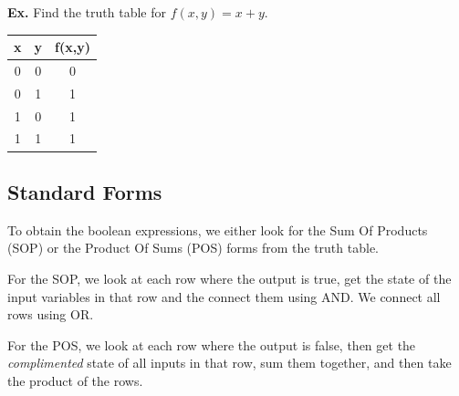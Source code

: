 \documentclass[12pt,letterpaper]{article} \usepackage{amsmath} \usepackage{graphicx}  \usepackage{longtable}  \usepackage{amssymb}
\begin{document}
    \begin{mdframed}
        \textbf{Ex. } Find the truth table for $f(x,y) = x+y$.

        \begin{center}
            \begin{tabular}{ c | c | c }
                x & y & f(x,y) \\
                \hline
                0&0&0\\
                0&1&1\\
                1&0&1\\
                1&1&1
            \end{tabular}        
        \end{center}
        
    \end{mdframed}

        \subsection{Standard Forms}
        To obtain the boolean expressions, we either look for the Sum Of Products (SOP) or the Product Of Sums (POS) forms from the truth table. 

        For the SOP, we look at each row where the output is true, get the state of the input variables in that row and the connect them using AND. We connect all rows using OR. 

        For the POS, we look at each row where the output is false, then get the \emph{complimented} state of all inputs in that row, sum them together, and then take the product of the rows. 
\end{document}
